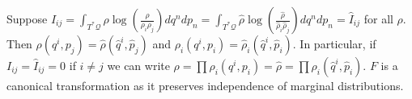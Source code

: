 \documentclass[smallextended]{svjour3}
\numberwithin{equation}{section}
\theoremstyle{definition}
\begin{document}
Suppose $I_{ij} = \int_{T^*\mathcal{Q}} \rho \log (\frac{\rho}{\rho_i \rho_j}) dq^n dp_n = \int_{T^*\mathcal{Q}} \hat{\rho} \log (\frac{\hat{\rho}}{\hat{\rho}_i \hat{\rho}_j}) dq^n dp_n = \hat{I}_{ij}$ for all $\rho$. Then $\rho(q^i, p_j)=\hat{\rho}(\hat{q}^i, \hat{p}_j)$ and $\rho_i(q^i, p_i)=\hat{\rho}_i(\hat{q}^i, \hat{p}_i)$. In particular, if $I_{ij} = \hat{I}_{ij} = 0$ if $i\neq j$ we can write $\rho=\prod\rho_i(q^i,p_i) = \hat{\rho} = \prod\rho_i(\hat{q}^i,\hat{p}_i)$. $F$ is a canonical transformation as it preserves independence of marginal distributions.

\begin{thebibliography}{0}
	
\end{thebibliography}
\end{document}
